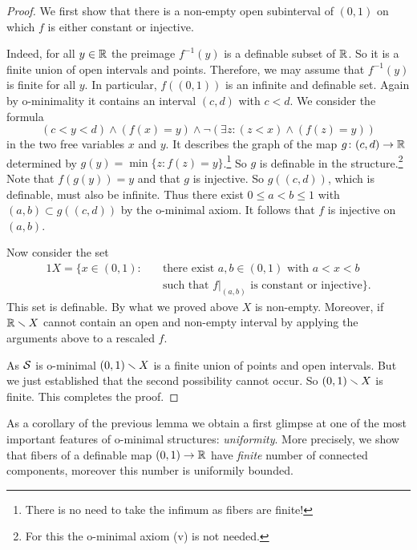 \begin{proof}
  We first show that there is a non-empty open subinterval of $(0,1)$
  on which $f$ is either constant or injective. 

  Indeed, for all $y\in{\mathbb{R}}$ the preimage $f^{-1}(y)$ is a definable subset of
  ${\mathbb{R}}$. So it is a finite union of open intervals and points.
  Therefore, we may assume that  $f^{-1}(y)$ is finite for all $y$.
  In particular, $f((0,1))$ is an infinite and definable set. Again by
  o-minimality it contains an interval $(c,d)$ with $c<d$.
  We consider the formula 
  \begin{equation*}
    (c<y<d) \wedge (f(x)=y) \wedge \neg (\exists z : (z<x) \wedge (f(z)=y))
  \end{equation*}
  in the two free variables $x$ and $y$. It describes the graph
  of the map $g\colon (c,d)\rightarrow {\mathbb{R}}$ determined by
  $g(y) = \min\{z : f(z)=y\}$.\footnote{There is no need to take the
    infimum as fibers are finite!} So  $g$ is
  definable in the structure.\footnote{For this the o-minimal axiom
    (v) is not needed.} Note that $f(g(y))=y$ and that $g$ is
  injective. So $g((c,d))$, which is definable, must also be infinite.
  Thus there exist $0\le a<b\le 1$ with $(a,b)\subset g((c,d))$ by the
  o-minimal axiom. It follows that $f$ is injective on $(a,b)$.

  Now consider the set
  \begin{alignat*}1
    X=\{ x\in (0,1): \quad &\text{there exist $a,b\in (0,1)$ with $a<x<b$}
    \\ &\text{such
      that
      $f|_{(a,b)}$ is constant or injective}\}. 
  \end{alignat*}
  This set is definable. By what we proved above $X$ is non-empty.
  Moreover, if ${\mathbb{R}}\smallsetminus X$ cannot contain an open and non-empty
  interval by applying the arguments above to a rescaled $f$.
  
  As ${\mathcal S}$ is o-minimal $(0,1)\smallsetminus X$ is a finite union of points and
  open intervals. But we just established that the second possibility
  cannot occur. So $(0,1)\smallsetminus X$ is finite. This completes the proof. 
\end{proof}

As a corollary of the previous lemma we obtain a first glimpse at one
of the most important features of o-minimal structures:
\emph{uniformity}. More precisely, we show that fibers of a definable
map $(0,1)\rightarrow{\mathbb{R}}$ have \emph{finite} number of connected
components, moreover this number is uniformily bounded. 

